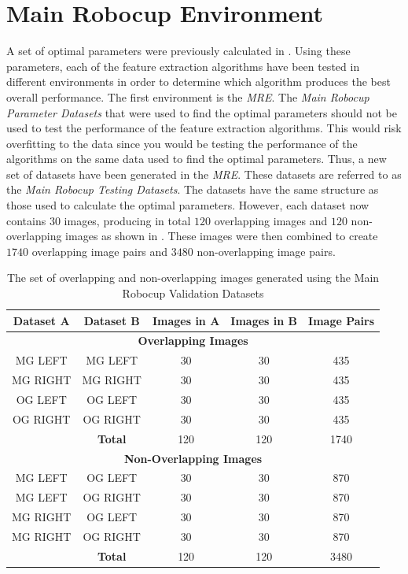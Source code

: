 \documentclass{report}
\begin{document}
\section{Main Robocup Environment}
\label{sec:mrdPerformance}
A set of optimal parameters were previously calculated in . Using these parameters, each of the feature extraction algorithms have been tested in different environments in order to determine which algorithm produces the best overall performance. The first environment is the \textit{MRE}. The \textit{Main Robocup Parameter Datasets} that were used to find the optimal parameters should not be used to test the performance of the feature extraction algorithms. This would risk overfitting to the data since you would be testing the performance of the algorithms on the same data used to find the optimal parameters. Thus, a new set of datasets have been generated in the \textit{MRE}. These datasets are referred to as the \textit{Main Robocup Testing Datasets}. The datasets have the same structure as those used to calculate the optimal parameters. However, each dataset now contains $30$ images, producing in total $120$ overlapping images and $120$ non-overlapping images as shown in . These images were then combined to create $1740$ overlapping image pairs and $3480$ non-overlapping image pairs.\\

\begin{table}
\caption{The set of overlapping and non-overlapping images generated using
the Main Robocup Validation Datasets}
\begin{tabular}{|c|c|c|c|c|}
\hline 
\textbf{Dataset A} & \textbf{Dataset B} & \textbf{Images in A} & \textbf{Images in B} & \textbf{Image Pairs}\tabularnewline
\hline 
\hline 
\multicolumn{5}{|c}{\textbf{Overlapping Images}}\tabularnewline
\hline 
MG LEFT & MG LEFT & 30 & 30 & 435\tabularnewline
\hline 
MG RIGHT & MG RIGHT & 30 & 30 & 435\tabularnewline
\hline 
OG LEFT & OG LEFT & 30 & 30 & 435\tabularnewline
\hline 
OG RIGHT & OG RIGHT & 30 & 30 & 435\tabularnewline
\hline 
 & \textbf{Total} & 120 & 120 & 1740\tabularnewline
\hline 
\multicolumn{5}{|c}{\textbf{Non-Overlapping Images}}\tabularnewline
\hline 
MG LEFT & OG LEFT & 30 & 30 & 870\tabularnewline
\hline 
MG LEFT & OG RIGHT & 30 & 30 & 870\tabularnewline
\hline 
MG RIGHT & OG LEFT & 30 & 30 & 870\tabularnewline
\hline 
MG RIGHT & OG RIGHT & 30 & 30 & 870\tabularnewline
\hline 
 & \textbf{Total} & 120 & 120 & 3480\tabularnewline
\hline 
\end{tabular}
\label{tab:mrtd}
\end{table}
\end{document}
